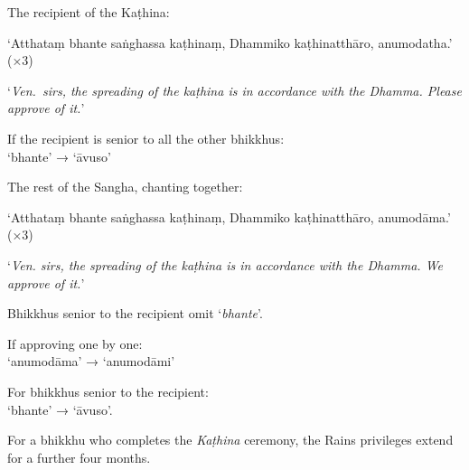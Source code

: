 The recipient of the Kaṭhina:

‘Atthataṃ bhante saṅghassa kaṭhinaṃ, Dhammiko kaṭhinatthāro, anumodatha.’ (×3)

‘\emph{Ven.\ sirs, the spreading of the kaṭhina is in accordance with the Dhamma.
  Please approve of it.}’

If the recipient is senior to all the other bhikkhus:\\
‘bhante’ → ‘āvuso’

The rest of the Sangha, chanting together:

‘Atthataṃ bhante saṅghassa kaṭhinaṃ, Dhammiko kaṭhinatthāro, anumodāma.’ (×3)

‘\emph{Ven. sirs, the spreading of the kaṭhina is in accordance with the Dhamma.
  We approve of it.}’


Bhikkhus senior to the recipient omit ‘\emph{bhante}’.

If approving one by one:\\
‘anumodāma’ → ‘anumodāmi’

For bhikkhus senior to the recipient:\\
‘bhante’ → ‘āvuso’.

For a bhikkhu who completes the \emph{Kaṭhina} ceremony, the Rains privileges
extend for a further four months.


